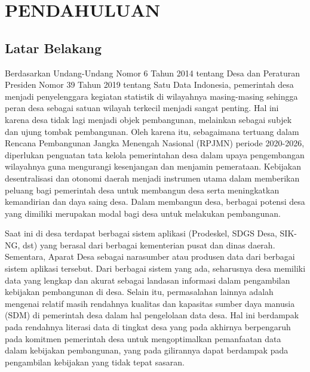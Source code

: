 
\chapter{PENDAHULUAN}

\section{Latar Belakang}

Berdasarkan Undang-Undang Nomor 6 Tahun 2014 tentang Desa dan Peraturan Presiden Nomor 39 Tahun 2019 tentang Satu Data Indonesia, pemerintah desa menjadi penyelenggara kegiatan statistik di wilayahnya masing-masing sehingga peran desa sebagai satuan wilayah terkecil menjadi sangat penting. Hal ini karena desa tidak lagi menjadi objek pembangunan, melainkan sebagai subjek dan ujung tombak pembangunan. Oleh karena itu, sebagaimana tertuang dalam Rencana Pembangunan Jangka Menengah Nasional (RPJMN) periode 2020-2026, diperlukan penguatan tata kelola pemerintahan desa dalam upaya pengembangan wilayahnya guna mengurangi kesenjangan dan menjamin pemerataan. Kebijakan desentralisasi dan otonomi daerah menjadi instrumen utama dalam memberikan peluang bagi pemerintah desa untuk membangun desa serta meningkatkan kemandirian dan daya saing desa. Dalam membangun desa, berbagai potensi desa yang dimiliki merupakan modal bagi desa untuk melakukan pembangunan.

Saat ini di desa terdapat berbagai sistem aplikasi (Prodeskel, SDGS Desa, SIK-NG, dst) yang berasal dari berbagai kementerian pusat dan dinas daerah. Sementara, Aparat Desa sebagai narasumber atau produsen data dari berbagai sistem aplikasi tersebut. Dari berbagai sistem yang ada, seharusnya desa memiliki data yang lengkap dan akurat sebagai landasan informasi dalam pengambilan kebijakan pembangunan di desa. Selain itu, permasalahan lainnya adalah mengenai relatif masih rendahnya kualitas dan kapasitas sumber daya manusia (SDM) di pemerintah desa dalam hal pengelolaan data desa. Hal ini berdampak pada rendahnya literasi data di tingkat desa yang pada akhirnya berpengaruh pada komitmen pemerintah desa untuk mengoptimalkan pemanfaatan data dalam kebijakan pembangunan, yang pada gilirannya dapat berdampak pada pengambilan kebijakan yang tidak tepat sasaran.

